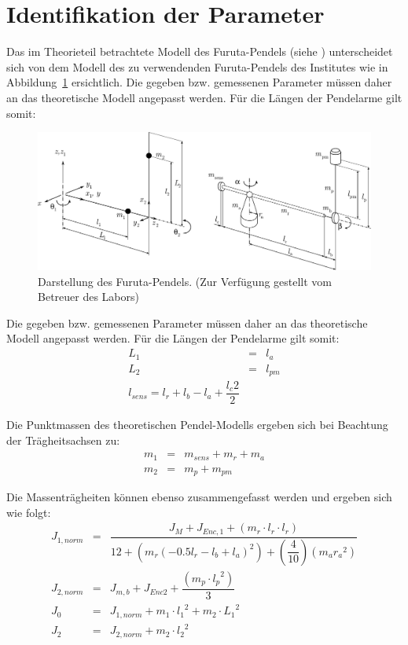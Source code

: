 \section{Identifikation der Parameter}
\label{sec.Parameter}

Das im Theorieteil betrachtete Modell des Furuta-Pendels (siehe \cite{Cazzolato.2011}) unterscheidet sich von dem Modell des zu verwendenden Furuta-Pendels des Institutes wie in Abbildung~\ref{fig.FurutaPlant} ersichtlich.
Die gegeben bzw. gemessenen Parameter müssen daher an das theoretische Modell angepasst werden. Für die Längen der Pendelarme gilt somit:

\begin{figure}[htbp]
	\centering
	\includegraphics[width=1.\textwidth]{Grafiken/adelaideimagenew}
	\caption{Darstellung des Furuta-Pendels. (Zur Verfügung gestellt vom Betreuer des Labors) }
	\label{fig.FurutaPlant}
\end{figure}

Die gegeben bzw. gemessenen Parameter müssen daher an das theoretische Modell angepasst werden. Für die Längen der Pendelarme gilt somit:
\begin{eqnarray}
L_1 &=& l_a \nonumber \\
L_2 &=& l_{pm} \nonumber \\
l_{sens}=l_r+l_b-l_a+\dfrac{l_c2}{2}
\end{eqnarray}

Die Punktmassen des theoretischen Pendel-Modells ergeben sich bei Beachtung der Trägheitsachsen zu:
\begin{eqnarray}
m_1 &=& m_{sens}+m_r+m_a \nonumber \\
m_2 &=& m_p+m_{pm}
\end{eqnarray}

Die Massenträgheiten können ebenso zusammengefasst werden und ergeben sich wie folgt:
\begin{eqnarray*}
J_{1,norm}&=&\dfrac{J_M +J_{Enc,1}+(m_r \cdot l_r \cdot l_r)}{12+(m_r (-0.5 l_r-l_b+l_a)^2)+(\dfrac{4}{10}) (m_a  {r_a}^{2})} \\
J_{2,norm}&=& J_{m,b}+J_{Enc2}   + \dfrac{(m_p \cdot {l_p}^{2})}{3} \\
J_0&=&J_{1,norm}+ m_1 \cdot {l_1}^{2} + m_2 \cdot {L_1}^{2} \\ 
J_2&=&J_{2,norm}+m_2 \cdot {l_2}^2           \\
\end{eqnarray*}

